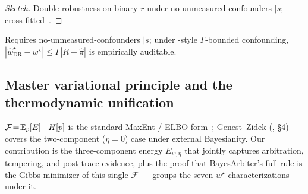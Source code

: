 \begin{proof}[Sketch]
Double-robustness on binary $r$ under no-unmeasured-confounders
$\mid s$; cross-fitted~\citep{chernozhukov2018doubleml}.
\end{proof}

\begin{remark}[Scope of T16]
Requires no-unmeasured-confounders $\mid s$; under
\citet{rosenbaum1983central}-style $\Gamma$-bounded confounding,
$|\widehat w^\star_{\mathrm{DR}}\!-\!w^\star|\!\le\!\Gamma|R\!-\!\widehat\pi|$
is empirically auditable.
\end{remark}

\subsection{Master variational principle and the thermodynamic unification}
\label{app:master-free-energy}

$\mathcal{F}\!=\!\mathbb{E}_p[E]\!-\!H[p]$ is the standard MaxEnt /
ELBO form~\citep{jaynes1957information,wainwright2008graphical};
Genest--Zidek (\citeyear{genest1986characterization}, \S 4)
covers the two-component ($\eta\!=\!0$) case under external
Bayesianity.  Our contribution is the three-component energy
$E_{w,\eta}$ that jointly captures arbitration, tempering, and
post-trace evidence, plus the proof that BayesArbiter's full
rule is the Gibbs minimizer of this single $\mathcal{F}$ ---
 groups the seven $w^\star$ characterizations
under it.

